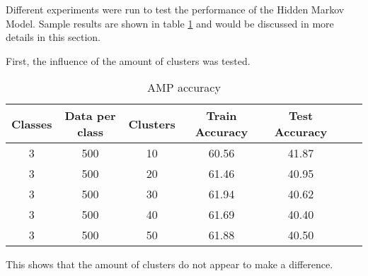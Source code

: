 
\begin{comment}
Experiments / Empirical evaluation (roughly 2-3 pages)
• Any details about experiments (dataset sizes, parameter selection, etc)
• Results
• Analysis (discussion of results / visualization / findings / etc)
\end{comment}


Different experiments were run to test the performance of the Hidden Markov Model. Sample results are shown in table \ref{table:HMMaccuracy} and would be discussed in more details in this section.

First, the influence of the amount of clusters was tested.

\begin{table}[h!]
\begin{center}
\begin{tabular}{| c | c | c | c | c | c | c |}
\hline
 {\textbf{Classes}} 	 
 & {\textbf{Data per class}} 					& {\textbf{Clusters}} 
 & {\textbf{Train Accuracy}} 					& {\textbf{Test Accuracy}} 
 \\
\hline
3 	 		& 500 		& 10			& 60.56		& 41.87		\\
3 	 		& 500 		& 20			& 61.46		& 40.95		\\
3 	 		& 500 		& 30			& 61.94		& 40.62		\\
3 	 		& 500 		& 40			& 61.69		& 40.40		\\
3 	 		& 500 		& 50			& 61.88		& 40.50		\\
\hline
\end{tabular}
\caption{AMP accuracy}
\label{table:HMMaccuracy}
\end{center}
\end{table}

This shows that the amount of clusters do not appear to make a difference. 

\begin{comment}
\red{correct the table for the HMM}
\begin{table}[h!]
\begin{center}
\begin{tabular}{| c | c | c | c | c | c | c |}
\hline
 {\textbf{Classes}} 			& {\textbf{Features}} 
 & {\textbf{Data per class}} 					& {\textbf{Clusters}} 
 & {\textbf{Train Axccuracy}} 					& {\textbf{Test Accuracy}} 
 \\
\hline
2 			& all 				& 500 		& 50			& ?			& ? 			\\
2 			& subset 		& 500 		& 50			& ?			& ? 			\\
3 			& all 				& 500 		& 50			& ?			& ? 			\\
3 			& subset 		& 500 		& 50			& ?			& ? 			\\
14 		& all		 		& 500 		& 50			& ?			& ? 			\\
14 		& subset 		& 500 		& 50			& ?			& ? 			\\
\hline
\end{tabular}
\caption{AMP accuracy}
\label{table:HMMaccuracy}
\end{center}
\end{table}
\end{comment}

